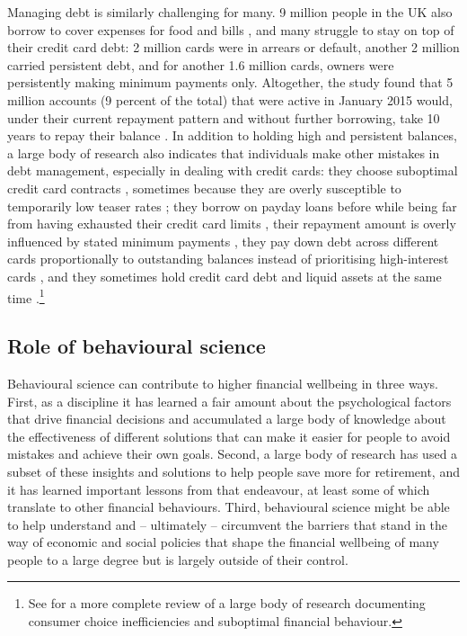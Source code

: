 Managing debt is similarly challenging for many. 9 million people in the UK
also borrow to cover expenses for food and bills \citep{mps2018building}, and
many struggle to stay on top of their credit card debt: 2 million cards were in
arrears or default, another 2 million carried persistent debt, and for another
1.6 million cards, owners were persistently making minimum payments only.
Altogether, the study found that 5 million accounts (9 percent of the total)
that were active in January 2015 would, under their current repayment pattern
and without further borrowing, take 10 years to repay their balance
\citep{fca2016credit}. In addition to holding high and persistent balances, a
large body of research also indicates that individuals make other mistakes in
debt management, especially in dealing with credit cards: they choose
suboptimal credit card contracts \citep{agarwal2015consumers}, sometimes
because they are overly susceptible to temporarily low teaser rates
\citep{shui2004time, ausubel1991failure}; they borrow on payday loans before
while being far from having exhausted their credit card limits
\citep{agarwal2009payday}, their repayment amount is overly influenced by
stated minimum payments \citep{sakaguchi2022default}, they pay down debt across
different cards proportionally to outstanding balances instead of prioritising
high-interest cards \citep{gathergood2019individuals}, and they sometimes hold
credit card debt and liquid assets at the same time \citep{gross2002liquidity,
    gathergood2020co}.\footnote{See \citet{agarwal2017shapes} for a more
    complete review of a large body of research documenting consumer choice
inefficiencies and suboptimal financial behaviour.} 


\subsection{Role of behavioural science}%
\label{sub:role_of_behavioural_science}

Behavioural science can contribute to higher financial wellbeing in three ways.
First, as a discipline it has learned a fair amount about the psychological
factors that drive financial decisions and accumulated a large body of
knowledge about the effectiveness of different solutions that can make it
easier for people to avoid mistakes and achieve their own goals. Second, a
large body of research has used a subset of these insights and solutions to
help people save more for retirement, and it has learned important lessons from
that endeavour, at least some of which translate to other financial behaviours.
Third, behavioural science might be able to help understand and -- ultimately
-- circumvent the barriers that stand in the way of economic and social
policies that shape the financial wellbeing of many people to a large degree
but is largely outside of their control.

